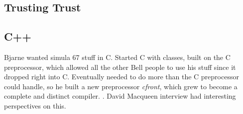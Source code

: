 \subsection{Trusting Trust}


\subsection{C++}

Bjarne wanted simula 67 stuff in C. Started C with classes, built on the C preprocessor,
which allowed all the other Bell people to use his stuff since it dropped right into C.
Eventually needed to do more than the C preprocessor could handle, so he built a new
preprocessor \textit{cfront}, which grew to become a complete and distinct compiler.
.
David Macqueen interview had interesting perspectives on this.
